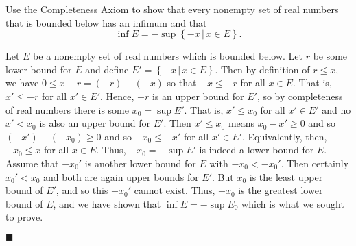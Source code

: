 \documentclass[12pt]{article}
\renewcommand{\qed}{\hfill$\blacksquare$}
\renewenvironment{proof}{\begin{addmargin}[1em]{0em}\begin{newproof}}{\end{newproof}\end{addmargin}\qed}
\newenvironment{problem}[2][Problem]{\begin{trivlist}
\item[\hskip \labelsep {\bfseries #1}\hskip \labelsep {\bfseries #2.}]}{\end{trivlist}}
\begin{document}
\begin{problem}{1.1.6}
Use the Completeness Axiom to show that every nonempty set of real numbers that is bounded below has an infimum and that \[ \inf E = -\sup \left\{ -x \, | \, x\in E \right\}. \]
\end{problem}
\begin{proof}
Let $E$ be a nonempty set of real numbers which is bounded below. Let $r$ be some lower bound for $E$ and define $E' = \left\{ -x \, | \, x\in E \right\}$. Then by definition of $r \leq x$, we have $0 \leq x - r = \left(-r\right) - \left(-x\right)$ so that $-x \leq -r$ for all $x \in E$. That is, $x' \leq -r$ for all $x' \in E'$. Hence, $-r$ is an upper bound for $E'$, so by completeness of real numbers there is some $x_0 = \sup E'$. That is, $x' \leq x_0$ for all $x' \in E'$ and no $x' < x_0$ is also an upper bound for $E'$. Then $x' \leq x_0$ means $x_0 - x' \geq 0$ and so $\left(-x'\right) - \left(-x_0\right) \geq 0$ and so $-x_0 \leq -x'$ for all $x' \in E'$.  Equivalently, then, $-x_0 \leq x $ for all $x \in E$. Thus, $-x_0=-\sup E'$ is indeed a lower bound for $E$. Assume that $-x_0'$ is another lower bound for $E$ with $-x_0 <-x_0'$. Then certainly $x_0' < x_0$ and both are again upper bounds for $E'$. But $x_0$ is the least upper bound of $E'$, and so this $-x_0'$ cannot exist. Thus, $-x_0$ is the greatest lower bound of $E$, and we have shown that $\inf E = -\sup E_0$ which is what we sought to prove.
\end{proof}
\end{document}
